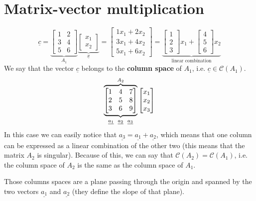 \section{Matrix-vector multiplication}
\[
\underline{c} = \underbrace{\begin{bmatrix}
    1 & 2\\
    3 & 4\\
    5 & 6
\end{bmatrix}}_{A_1}
\underbrace{\begin{bmatrix}
    x_1\\
    x_2
\end{bmatrix}}_{\underline{x}}
= 
\begin{bmatrix}
    1x_1 + 2x_2\\
    3x_1 + 4x_2\\
    5x_1 + 6x_2 
\end{bmatrix}
=
\underbrace{
\begin{bmatrix}
    1\\
    2\\
    3
\end{bmatrix}
x_1+
\begin{bmatrix}
    4\\
    5\\
    6
\end{bmatrix}
x_2
}_{\text{linear combination}}
\]
We say that the vector $\underline{c}$ belongs to the \textbf{column space} of $A_1$, i.e. $\underline{c} \in \mathcal{C}(A_1)$.
\[
\overbrace{
\underbrace{
\begin{bmatrix}
    1 & 4 & 7\\
    2 & 5 & 8\\
    3 & 6 & 9
\end{bmatrix}}_{\underline{a_1} \hspace{0.2cm} \underline{a_2} \hspace{0.2cm} \underline{a_3}}
}^{A_2}
\begin{bmatrix}
    x_1\\
    x_2\\
    x_3
\end{bmatrix}
\]
In this case we can easily notice that $\underline{a_3} = \underline{a_1} + \underline{a_2}$, which means that one column can be expressed as a linear combination of the other two (this means that the matrix $A_2$ is singular). Because of this, we can say that $\mathcal{C}(A_2) = \mathcal{C}(A_1)$, i.e. the column space of $A_2$ is the same as the column space of $A_1$.

Those columns spaces are a plane passing through the origin and spanned by the two vectors $\underline{a_1}$ and $\underline{a_2}$ (they define the slope of that plane).

